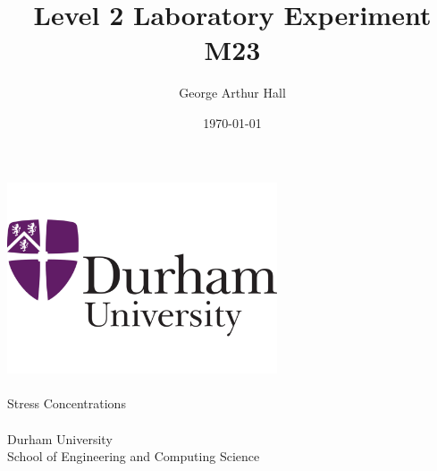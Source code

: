 \documentclass[11pt,twocolumn]{article} %
\title{Level 2 Laboratory Experiment M23} %
\author{George Arthur Hall} %
\date{\today} %
\begin{document}
 \begin{titlepage}
 \centering
 \vspace*{\fill}
 \includegraphics[width=0.6\textwidth]{logo.pdf} \\
 \vspace*{\fill}
 \LARGE\thetitle \\
 \Large Stress Concentrations \\
 \Large\theauthor \\
 \Large Durham University \\
 \Large School of Engineering and Computing Science \\
  \Large\thedate
 \vspace*{\fill}
 \end{titlepage}
\onecolumn
\tableofcontents{} %
\vspace{4mm}
\end{document}
